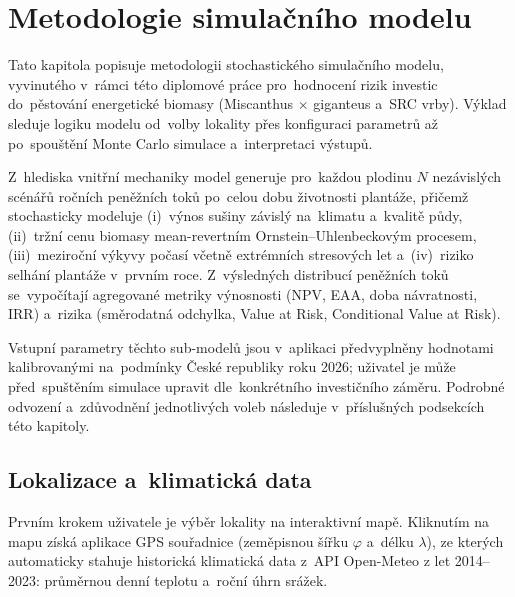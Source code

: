 \chapter{Metodologie simulačního modelu}
\label{chap:metodologie}

Tato kapitola popisuje metodologii stochastického simulačního modelu,
vyvinutého v~rámci této diplomové práce pro~hodnocení rizik investic
do~pěstování energetické biomasy (Miscanthus $\times$ giganteus a~SRC
vrby). Výklad sleduje logiku modelu od~volby lokality přes konfiguraci
parametrů až po~spouštění Monte Carlo simulace a~interpretaci výstupů.

Z~hlediska vnitřní mechaniky model generuje pro~každou plodinu $N$
nezávislých scénářů ročních peněžních toků po~celou dobu životnosti
plantáže, přičemž stochasticky modeluje (i)~výnos sušiny závislý
na~klimatu a~kvalitě půdy, (ii)~tržní cenu biomasy mean-revertním
Ornstein--Uhlenbeckovým procesem, (iii)~meziroční výkyvy počasí
včetně extrémních stresových let a~(iv)~riziko selhání plantáže
v~prvním roce. Z~výsledných distribucí peněžních toků se~vypočítají
agregované metriky výnosnosti (NPV, EAA, doba návratnosti, IRR)
a~rizika (směrodatná odchylka, Value at Risk, Conditional Value at Risk).

Vstupní parametry těchto sub-modelů jsou v~aplikaci předvyplněny
hodnotami kalibrovanými na~podmínky České republiky roku 2026;
uživatel je může před~spuštěním simulace upravit dle~konkrétního
investičního záměru. Podrobné odvození a~zdůvodnění jednotlivých
voleb následuje v~příslušných podsekcích této kapitoly.


\section{Lokalizace a~klimatická data}
\label{sec:lokalizace}

Prvním krokem uživatele je výběr lokality na interaktivní mapě. Kliknutím na mapu získá aplikace GPS souřadnice (zeměpisnou šířku $\varphi$ a~délku $\lambda$), ze kterých automaticky stahuje historická klimatická data z~API Open-Meteo \citep{OpenMeteo2023} z let 2014--2023: průměrnou denní teplotu a~roční úhrn srážek.

